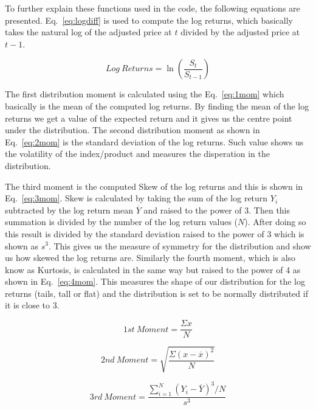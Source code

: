 \noindent
To further explain these functions used in the code, the following equations are presented. Eq.~\ref{eq:logdiff} is used to compute the log returns, which basically takes the natural log of the adjusted price at $t$ divided by the adjusted price at $t - 1$.

\begin{equation} \label{eq:logdiff}
    Log \ Returns = \ln(\frac{S_t}{S_{t-1}})
\end{equation}

\noindent
The first distribution moment is calculated using the Eq.~\ref{eq:1mom} which basically is the mean of the computed log returns. By finding the mean of the log returns we get a value of the expected return and it gives us the centre point under the distribution. The second distribution moment as shown in Eq.~\ref{eq:2mom} is the standard deviation of the log returns. Such value shows us the volatility of the index/product and measures the disperation in the distribution.

\noindent
The third moment is the computed Skew of the log returns and this is shown in Eq.~\ref{eq:3mom}. Skew is calculated by taking the sum of the log return $Y_i$ subtracted by the log return mean $\overline{Y}$ and raised to the power of 3. Then this summation is divided by the number of the log return values ($N$). After doing so this result is divided by the standard deviation raised to the power of 3  which is shown as $s^3$. This gives us the measure of symmetry for the distribution and show us how skewed the log returns are. Similarly the fourth moment, which is also know as Kurtosis, is calculated in the same way but raised to the power of 4 as shown in Eq.~\ref{eq:4mom}. This measures the shape of our distribution for the log returns (tails, tall or flat) and the distribution is set to be normally distributed if it is close to 3. 

\begin{equation} \label{eq:1mom}
    1st \ Moment = \frac{\Sigma x}{N}
\end{equation}

\begin{equation} \label{eq:2mom}
    2nd \ Moment = \sqrt{\frac{\Sigma(x - \overline{x})^2}{N}}
\end{equation}

\begin{equation} \label{eq:3mom}
    3rd \ Moment = \frac{\sum_{i=1}^{N}(Y_i - \overline{Y})^3 / N}{s^3}
\end{equation}

